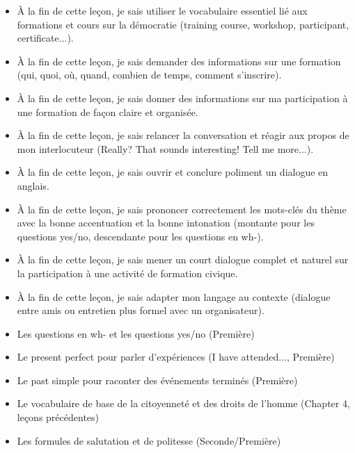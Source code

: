 \documentclass[11pt]{article}
\begin{document}
\begin{objectifs}
\begin{itemize}
\item À la fin de cette leçon, je sais utiliser le vocabulaire essentiel lié aux formations et cours sur la démocratie (training course, workshop, participant, certificate...).
\item À la fin de cette leçon, je sais demander des informations sur une formation (qui, quoi, où, quand, combien de temps, comment s'inscrire).
\item À la fin de cette leçon, je sais donner des informations sur ma participation à une formation de façon claire et organisée.
\item À la fin de cette leçon, je sais relancer la conversation et réagir aux propos de mon interlocuteur (Really? That sounds interesting! Tell me more...).
\item À la fin de cette leçon, je sais ouvrir et conclure poliment un dialogue en anglais.
\item À la fin de cette leçon, je sais prononcer correctement les mots-clés du thème avec la bonne accentuation et la bonne intonation (montante pour les questions yes/no, descendante pour les questions en wh-).
\item À la fin de cette leçon, je sais mener un court dialogue complet et naturel sur la participation à une activité de formation civique.
\item À la fin de cette leçon, je sais adapter mon langage au contexte (dialogue entre amis ou entretien plus formel avec un organisateur).
\end{itemize}
\end{objectifs}

\begin{prerequis}
\begin{itemize}
\item Les questions en wh- et les questions yes/no (Première)
\item Le present perfect pour parler d'expériences (I have attended..., Première)
\item Le past simple pour raconter des événements terminés (Première)
\item Le vocabulaire de base de la citoyenneté et des droits de l'homme (Chapter 4, leçons précédentes)
\item Les formules de salutation et de politesse (Seconde/Première)
\end{itemize}
\end{prerequis}
\end{document}
